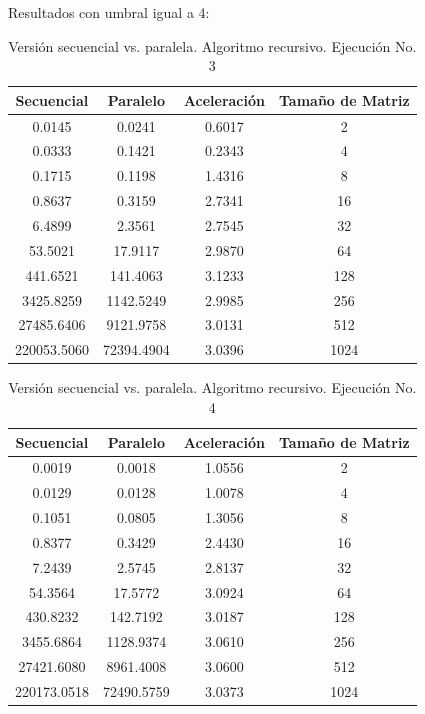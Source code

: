 \documentclass{article}
\begin{document}
Resultados con umbral igual a 4:

\begin{table}[ht]
\centering
\begin{tabular}{|c|c|c|c|}
\hline
\textbf{Secuencial} & \textbf{Paralelo} & \textbf{Aceleración} & \textbf{Tamaño de Matriz} \\
\hline
0.0145 & 0.0241 & 0.6017 & 2 \\
0.0333 & 0.1421 & 0.2343 & 4 \\
0.1715 & 0.1198 & 1.4316 & 8 \\
0.8637 & 0.3159 & 2.7341 & 16 \\
6.4899 & 2.3561 & 2.7545 & 32 \\
53.5021 & 17.9117 & 2.9870 & 64 \\
441.6521 & 141.4063 & 3.1233 & 128 \\
3425.8259 & 1142.5249 & 2.9985 & 256 \\
27485.6406 & 9121.9758 & 3.0131 & 512 \\
220053.5060 & 72394.4904 & 3.0396 & 1024 \\
\hline
\end{tabular}
\caption{Versión secuencial vs. paralela. Algoritmo recursivo. Ejecución No. 3}
\end{table}

\clearpage

\begin{table}[ht]
\centering
\begin{tabular}{|c|c|c|c|}
\hline
\textbf{Secuencial} & \textbf{Paralelo} & \textbf{Aceleración} & \textbf{Tamaño de Matriz} \\
\hline
0.0019 & 0.0018 & 1.0556 & 2 \\
0.0129 & 0.0128 & 1.0078 & 4 \\
0.1051 & 0.0805 & 1.3056 & 8 \\
0.8377 & 0.3429 & 2.4430 & 16 \\
7.2439 & 2.5745 & 2.8137 & 32 \\
54.3564 & 17.5772 & 3.0924 & 64 \\
430.8232 & 142.7192 & 3.0187 & 128 \\
3455.6864 & 1128.9374 & 3.0610 & 256 \\
27421.6080 & 8961.4008 & 3.0600 & 512 \\
220173.0518 & 72490.5759 & 3.0373 & 1024 \\
\hline
\end{tabular}
\caption{Versión secuencial vs. paralela. Algoritmo recursivo. Ejecución No. 4}
\end{table}
\end{document}
